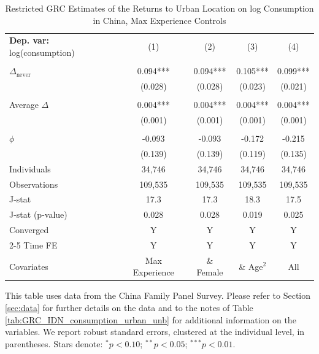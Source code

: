 \begin{table}[htbp] \centering \begin{threeparttable}
 \caption{Restricted GRC Estimates of the Returns to Urban Location on log Consumption in China, Max Experience Controls} 
 \label{tab:GRC_CHN_consumption_urban_unb_exp_max} 
\begin{tabular}{l cccc} \toprule  \textbf{Dep. var:}  log(consumption) 
                    &\multicolumn{1}{c}{(1)}   &\multicolumn{1}{c}{(2)}   &\multicolumn{1}{c}{(3)}   &\multicolumn{1}{c}{(4)}   \\
                    &               &               &               &               \\
\addlinespace
$\Delta_{\text{never}}$&       0.094***&       0.094***&       0.105***&       0.099***\\
                    &     (0.028)   &     (0.028)   &     (0.023)   &     (0.021)   \\
                    &               &               &               &               \\
\addlinespace
Average $\Delta$    &       0.004***&       0.004***&       0.004***&       0.004***\\
                    &     (0.001)   &     (0.001)   &     (0.001)   &     (0.001)   \\
                    &               &               &               &               \\
\addlinespace
$\phi$              &      -0.093   &      -0.093   &      -0.172   &      -0.215   \\
                    &     (0.139)   &     (0.139)   &     (0.119)   &     (0.135)   \\
\addlinespace
Individuals         &      34,746   &      34,746   &      34,746   &      34,746   \\
Observations        &     109,535   &     109,535   &     109,535   &     109,535   \\
J-stat              &        17.3   &        17.3   &        18.3   &        17.5   \\
J-stat (p-value)    &       0.028   &       0.028   &       0.019   &       0.025   \\
Converged           &           Y   &           Y   &           Y   &           Y   \\
\cmidrule{2-5} Time FE & Y & Y & Y & Y \\ Covariates & Max Experience & \& Female & \& Age$^2$ & All \\ \bottomrule \end{tabular} \begin{tablenotes}[flushleft] \footnotesize \item{This table uses data from the China Family Panel Survey. Please refer to Section \ref{sec:data} for further details on the data and to the notes of Table \ref{tab:GRC_IDN_consumption_urban_unb} for additional information on the variables. We report robust standard errors, clustered at the individual level, in parentheses. Stars denote: $^{*} p<0.10$; $^{**} p<0.05$; $^{***} p<0.01$.} \end{tablenotes} \end{threeparttable} \end{table}
